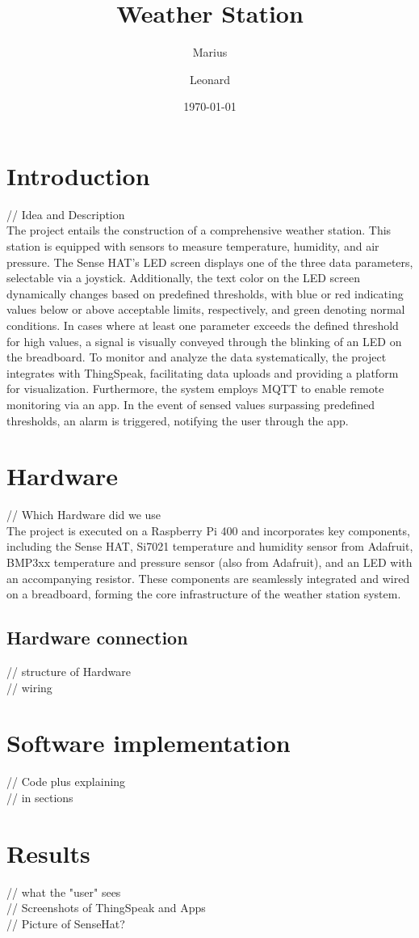 \documentclass{article}
\title{Weather Station}
\author{Marius \and Leonard}
\date{\today}
\begin{document}
\maketitle
\newpage
\tableofcontents
\newpage

\section{Introduction}
// Idea and Description\\
The project entails the construction of a comprehensive weather station. 
This station is equipped with sensors to measure temperature, humidity, and air pressure. 
The Sense HAT's LED screen displays one of the three data parameters, selectable via a joystick. 
Additionally, the text color on the LED screen dynamically changes based on predefined thresholds, with blue or red indicating values below or above acceptable limits, respectively, and green denoting normal conditions. 
In cases where at least one parameter exceeds the defined threshold for high values, a signal is visually conveyed through the blinking of an LED on the breadboard.
To monitor and analyze the data systematically, the project integrates with ThingSpeak, facilitating data uploads and providing a platform for visualization. 
Furthermore, the system employs MQTT to enable remote monitoring via an app. 
In the event of sensed values surpassing predefined thresholds, an alarm is triggered, notifying the user through the app.

\section{Hardware}
// Which Hardware did we use\\
The project is executed on a Raspberry Pi 400 and incorporates key components, including the Sense HAT, Si7021 temperature and humidity sensor from Adafruit, BMP3xx temperature and pressure sensor (also from Adafruit), and an LED with an accompanying resistor. 
These components are seamlessly integrated and wired on a breadboard, forming the core infrastructure of the weather station system.

\subsection{Hardware connection}
// structure of Hardware\\
// wiring

\section{Software implementation}
// Code plus explaining\\
// in sections

\section{Results}
// what the "user" sees\\
// Screenshots of ThingSpeak and Apps\\
// Picture of SenseHat?
\end{document}
